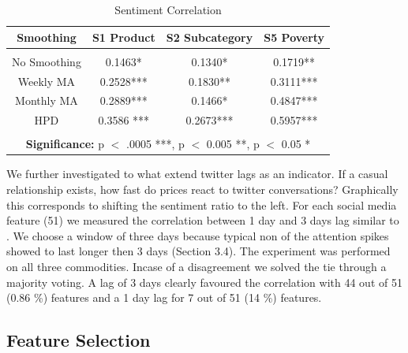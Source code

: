 \begin{table}[h]   
\centering
 \begin{tabular}{  c  | c  | c | c }
			
    \textbf{Smoothing}  & \textbf{S1 Product} & \textbf{S2 Subcategory} &\textbf{S5 Poverty} \\
  \hline 
  &&& \\
  No Smoothing & 0.1463*  &   0.1340* &    0.1719**  \\
  
  Weekly MA &    0.2528***   & 0.1830** &   0.3111***\\

  Monthly MA &  0.2889***  & 0.1466* & 0.4847*** \\

  HPD &  0.3586 ***  &  0.2673*** &   0.5957***  \\
  

\hline 

\multicolumn{4}{c}{\null}\\

\multicolumn{4}{c}{\textbf{Significance:} p $<$ .0005 ***, p $<$ 0.005 **, p $<$ 0.05 *}\\
\hline  

\end{tabular}
\caption{Sentiment Correlation}
\label{tab:smoothing_corr}


\end{table}


We further investigated to what extend twitter lags as an indicator. If a casual relationship exists, how fast do prices react to twitter conversations? Graphically this corresponds to shifting the sentiment ratio to the left. For each social media feature (51) we measured the correlation between 1 day and 3 days lag similar to \cite{Si_exploitingtopic}. We choose a window of three days because typical non of the attention spikes showed to last longer then 3 days (Section 3.4).  The experiment was performed on all three commodities. Incase of a disagreement we solved  the tie through a majority voting. A 
 lag of 3 days clearly favoured the correlation with 44 out of 51 (0.86 \%) features and a 1 day lag for 7 out of 51 (14 \%) features. 


\subsection{Feature Selection}

